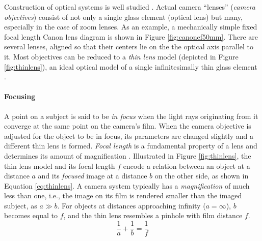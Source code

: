 Construction of optical systems is well studied \cite{kingslake1989history,greenleaf1950photographic}.
Actual camera ``lenses'' (\emph{camera objectives}) consist of not only a single glass element (optical lens) but many, especially in the case of zoom lenses.
As an example, a mechanically simple fixed focal length Canon lens diagram is shown in Figure \ref{fig:canonef50mm}.
There are several lenses, aligned so that their centers lie on the the optical axis parallel to it.
Most objectives can be reduced to a \emph{thin lens} model (depicted in Figure \ref{fig:thinlens}), an ideal optical model of a single infinitesimally thin glass element \cite[p.~21]{greenleaf1950photographic} \cite[p.~61]{szeliski10vision}.




\paragraph{Focusing}
A point on a subject is said to be \emph{in focus} when the light rays originating from it converge at the same point on the camera's film.
When the camera objective is adjusted for the object to be in focus, its parameters are changed slightly and a different thin lens is formed.
\emph{Focal length} is a fundamental property of a lens and determines its amount of magnification \cite[p.~61]{szeliski10vision} \cite[p.~13]{greenleaf1950photographic}.
Illustrated in Figure \ref{fig:thinlens}, the thin lens model and its focal length $f$ encode a relation between an object at a distance $a$ and its \emph{focused} image at a distance $b$ on the other side, as shown in Equation \ref{eq:thinlens}.
A camera system typically has a \emph{magnification} of much less than one, i.e., the image on its film is rendered smaller than the imaged subject, as $a \gg b$.
For objects at distances approaching infinity ($a = \infty$), $b$ becomes equal to $f$, and the thin lens resembles a pinhole with film distance $f$.
\begin{equation} \label{eq:thinlens}
	\frac{1}{a} + \frac{1}{b} = \frac{1}{f}
\end{equation}

